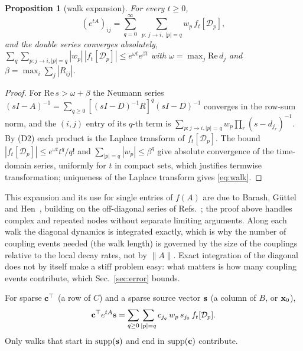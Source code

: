 \documentclass[aps,pra,superscriptaddress,floatfix,longbibliography,twocolumn]{revtex4-2}
\newcommand{\bx}{{\bf x}}
\newcommand{\bc}{{\bf c}}
\newcommand{\bs}{{\bf s}}
\newtheorem{proposition}{Proposition}
\begin{document}
\begin{proposition}[walk expansion]\label{prop:walk}
For every $t\ge0$,
\begin{equation}\label{eq:walk}
(e^{tA})_{ij}=\sum_{q=0}^{\infty}\ \sum_{p:\,j\to i,\ |p|=q} w_p\, f_t[\mathcal{D}_p],
\end{equation}
and the double series converges absolutely, $\sum_q\sum_{p:j\to i,|p|=q}|w_p|\,|f_t[\mathcal{D}_p]|\le e^{\omega t}e^{\beta t}$ with $\omega=\max_j\mathrm{Re}\,d_j$ and $\beta=\max_i\sum_j|R_{ij}|$.
\end{proposition}
\begin{proof}
For $\mathrm{Re}\,s>\omega+\beta$ the Neumann series $(sI-A)^{-1}=\sum_{q\ge0}[(sI-D)^{-1}R]^q(sI-D)^{-1}$ converges in the row-sum norm, and the $(i,j)$ entry of its $q$-th term is $\sum_{p:j\to i,|p|=q}w_p\prod_r(s-d_{j_r})^{-1}$. By (D2) each product is the Laplace transform of $f_t[\mathcal{D}_p]$. The bound $|f_t[\mathcal{D}_p]|\le e^{\omega t}t^q/q!$ and $\sum_{|p|=q}|w_p|\le\beta^q$ give absolute convergence of the time-domain series, uniformly for $t$ in compact sets, which justifies termwise transformation; uniqueness of the Laplace transform gives \eqref{eq:walk}.
\end{proof}
This expansion and its use for single entries of $f(A)$ are due to Barash, G\"uttel and Hen~\cite{barash2022}, building on the off-diagonal series of Refs.~\cite{albash2017,gupta2020pmr}; the proof above handles complex and repeated nodes without separate limiting arguments. Along each walk the diagonal dynamics is integrated exactly, which is why the number of coupling events needed (the walk length) is governed by the size of the couplings relative to the local decay rates, not by $\|A\|$. Exact integration of the diagonal does not by itself make a stiff problem easy: what matters is how many coupling events contribute, which Sec.~\ref{sec:error} bounds.

For sparse $\bc^\top$ (a row of $C$) and a sparse source vector $\bs$ (a column of $B$, or $\bx_0$),
\begin{equation}\label{eq:io_walk}
\bc^\top e^{tA}\bs=\sum_{q\ge0}\sum_{|p|=q} c_{j_q}\,w_p\,s_{j_0}\,f_t[\mathcal{D}_p].
\end{equation}
Only walks that start in $\mathrm{supp}(\bs)$ and end in $\mathrm{supp}(\bc)$ contribute.
\end{document}
